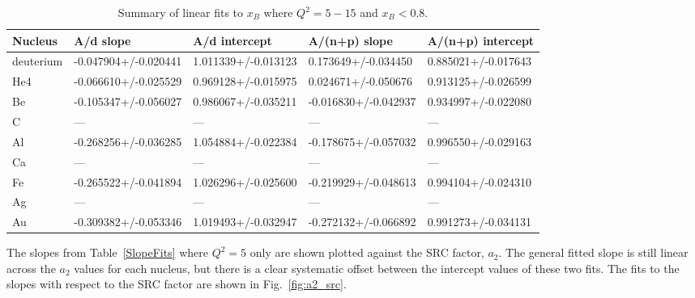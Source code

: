 \documentclass[oneside]{article}
\begin{document}
\begin{table}[htb!]
\caption{\label{SlopeFits2} Summary of linear fits to $x_B$ where $Q^2=5-15$ and $x_B<0.8$.}
\centering
\begin{tabular}{ | C{2.5cm} | C{2cm} | C{2cm} | C{2cm} | C{2cm} | }
 \hline
 \textbf{Nucleus} & \textbf{A/d slope} & \textbf{A/d intercept} & \textbf{A/(n+p) slope} & \textbf{A/(n+p) intercept} \\ 
  \hline
deuterium & -0.047904+/-0.020441	&1.011339+/-0.013123& 0.173649+/-0.034450	&0.885021+/-0.017643 \\ 
  \hline
  He4 &-0.066610+/-0.025529&	0.969128+/-0.015975 & 0.024671+/-0.050676&	0.913125+/-0.026599 \\ 
 \hline
 Be &-0.105347+/-0.056027&	0.986067+/-0.035211 &-0.016830+/-0.042937&	0.934997+/-0.022080\\ 
  \hline
   C &---&--- & ---	&--- \\ 
  \hline
    Al &-0.268256+/-0.036285	&1.054884+/-0.022384&-0.178675+/-0.057032&	0.996550+/-0.029163 \\ 
  \hline
 Ca &---&--- & ---	&--- \\ 
  \hline  
  Fe &-0.265522+/-0.041894	&1.026296+/-0.025600&-0.219929+/-0.048613	&0.994104+/-0.024310\\ 
  \hline 
  Ag &---&--- & ---	&---  \\ 
  \hline 
   Au & -0.309382+/-0.053346 &	1.019493+/-0.032947 & -0.272132+/-0.066892 &	0.991273+/-0.034131\\ 
  \hline 
    \end{tabular}
\end{table} 

The slopes from Table~\ref{SlopeFits} where $Q^2=5$ only are shown plotted against the SRC factor, $a_2$. The general fitted slope is still linear across the $a_2$ values for each nucleus, but there is a clear systematic offset between the intercept values of these two fits. The fits to the slopes with respect to the SRC factor are shown in Fig.~\ref{fig:a2_src}.
\end{document}
